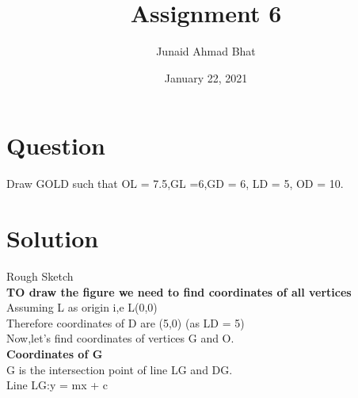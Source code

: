 \documentclass[a4paper,12pt]{article}
\begin{document}
\title{Assignment 6}
\author{Junaid Ahmad Bhat}
\date{January 22, 2021}
\maketitle
\section*{{\small Question}}
Draw GOLD such that OL = 7.5,GL =6,GD = 6, LD = 5, OD = 10.


\section*{{\small Solution}}
\begin{center}

\end{center}
\hspace*{6cm} Rough Sketch\\

\textbf{TO draw the figure we need to find coordinates of all vertices}\\

Assuming L as origin i,e L(0,0)\\

Therefore coordinates of D are (5,0) \hspace*{2cm}(as LD = 5)\\

Now,let's find coordinates of vertices G and O.\\

\textbf{Coordinates of G}\\

G is the intersection point of line LG and DG.\\

Line LG:y = mx + c\\
\end{document}
